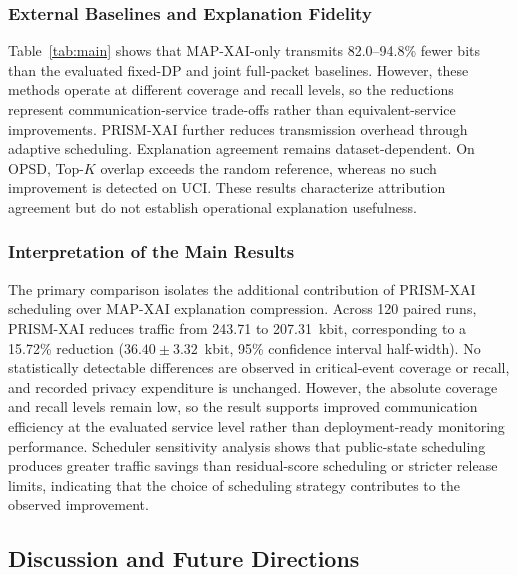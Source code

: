\documentclass[conference]{IEEEtran}
\begin{document}
\subsubsection{External Baselines and Explanation Fidelity}

Table~\ref{tab:main} shows that MAP-XAI-only
transmits 82.0--94.8\% fewer bits than the
evaluated fixed-DP and joint full-packet baselines.
However, these methods operate at different
coverage and recall levels, so the reductions
represent communication-service trade-offs
rather than equivalent-service improvements.
PRISM-XAI further reduces transmission overhead
through adaptive scheduling.
Explanation agreement remains dataset-dependent.
On OPSD, Top-$K$ overlap exceeds the random
reference, whereas no such improvement is
detected on UCI. These results characterize
attribution agreement but do not establish
operational explanation usefulness.



\subsubsection{Interpretation of the Main Results}

The primary comparison isolates the additional
contribution of PRISM-XAI scheduling over
MAP-XAI explanation compression. Across 120
paired runs, PRISM-XAI reduces traffic from
243.71 to 207.31~kbit, corresponding to a
15.72\% reduction ($36.40\pm3.32$~kbit,
95\% confidence interval half-width).
No statistically detectable differences are
observed in critical-event coverage or recall,
and recorded privacy expenditure is unchanged.
However, the absolute coverage and recall levels
remain low, so the result supports improved
communication efficiency at the evaluated
service level rather than deployment-ready
monitoring performance.
Scheduler sensitivity analysis shows that
public-state scheduling produces greater traffic
savings than residual-score scheduling or
stricter release limits, indicating that the
choice of scheduling strategy contributes
to the observed improvement.





\subsection{Discussion and Future Directions}
\end{document}
